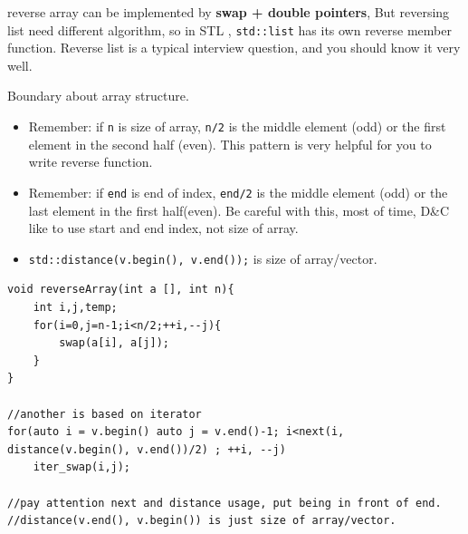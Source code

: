 \documentclass[a4paper,11pt,twoside]{book}
\begin{document}
	
	\par  reverse array can be implemented by \textbf{swap + double pointers}, But reversing list need different algorithm, so in STL , \texttt{std::list} has its own reverse member function. Reverse list is a typical interview question, and you should know it very well. 
	
	\par Boundary about array structure. 
	\begin{itemize}
		\item Remember: if \texttt{n} is size of array, \texttt{n/2} is the middle element (odd) or the first element in the second half (even). This pattern is very helpful for you to write reverse function. 
		
		\item Remember: if \texttt{end} is end of index, \texttt{end/2} is the middle element (odd) or the last element in the first half(even). Be careful with this, most of time, D\&C like to use start and end index, not size of array. 
		
		\item \texttt{std::distance(v.begin(), v.end());} is size of array/vector. 
	\end{itemize}
	
\begin{lstlisting}[breaklines]
void reverseArray(int a [], int n){
	int i,j,temp;
	for(i=0,j=n-1;i<n/2;++i,--j){
		swap(a[i], a[j]);
	}
}

//another is based on iterator
for(auto i = v.begin() auto j = v.end()-1; i<next(i, distance(v.begin(), v.end())/2) ; ++i, --j)
	iter_swap(i,j);

//pay attention next and distance usage, put being in front of end.
//distance(v.end(), v.begin()) is just size of array/vector. 
\end{lstlisting}
\end{document}
